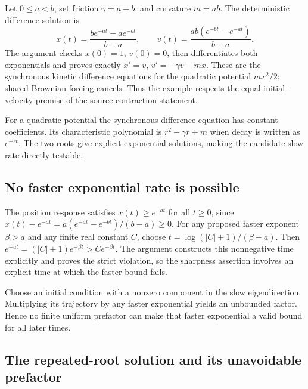\documentclass[11pt,a4paper]{report}
\begin{document}
Let \(0\le a<b\), set friction \(\gamma=a+b\), and curvature \(m=ab\). The deterministic difference solution is \[x(t)=\frac{be^{-at}-ae^{-bt}}{b-a},\qquad v(t)=\frac{ab(e^{-bt}-e^{-at})}{b-a}.\] The argument checks \(x(0)=1\), \(v(0)=0\), then differentiates both exponentials and proves exactly \(x\prime=v\), \(v\prime=-\gamma v-mx\). These are the synchronous kinetic difference equations for the quadratic potential \(mx^2/2\); shared Brownian forcing cancels. Thus the example respects the equal-initial-velocity premise of the source contraction statement.



For a quadratic potential the synchronous difference equation has constant coefficients. Its characteristic polynomial is \(r^2-\gamma r+m\) when decay is written as \(e^{-rt}\). The two roots give explicit exponential solutions, making the candidate slow rate directly testable.

\subsection{\texorpdfstring{No faster exponential rate is possible}{No faster exponential rate is possible}}
\label{report-step-KineticLangevin-QuadraticSharpness-lean-2}


The position response satisfies \(x(t)\ge e^{-at}\) for all \(t\ge0\), since \(x(t)-e^{-at}=a(e^{-at}-e^{-bt})/(b-a)\ge0\). For any proposed faster exponent \(\beta>a\) and any finite real constant \(C\), choose \(t=\log(|C|+1)/(\beta-a)\). Then \(e^{-at}=(|C|+1)e^{-\beta t}>Ce^{-\beta t}\). The argument constructs this nonnegative time explicitly and proves the strict violation, so the sharpness assertion involves an explicit time at which the faster bound fails.



Choose an initial condition with a nonzero component in the slow eigendirection. Multiplying its trajectory by any faster exponential yields an unbounded factor. Hence no finite uniform prefactor can make that faster exponential a valid bound for all later times.

\subsection{\texorpdfstring{The repeated-root solution and its unavoidable prefactor}{The repeated-root solution and its unavoidable prefactor}}
\label{report-step-KineticLangevin-QuadraticSharpness-lean-3}
\end{document}
